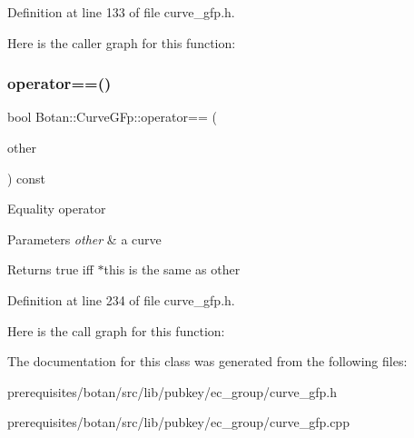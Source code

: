 Definition at line 133 of file curve\+\_\+gfp.\+h.

Here is the caller graph for this function\+:
\mbox{\label{class_botan_1_1_curve_g_fp_adf896804903ce76835069b5d51aeb161}} 
\subsubsection{\texorpdfstring{operator==()}{operator==()}}
{\footnotesize\ttfamily bool Botan\+::\+Curve\+G\+Fp\+::operator== (\begin{DoxyParamCaption}\item[{const \mbox{\hyperlink{class_botan_1_1_curve_g_fp}{Curve\+G\+Fp}} \&}]{other }\end{DoxyParamCaption}) const\hspace{0.3cm}{\ttfamily [inline]}}

Equality operator 
\begin{DoxyParams}{Parameters}
{\em other} & a curve \\
\hline
\end{DoxyParams}
\begin{DoxyReturn}{Returns}
true iff $\ast$this is the same as other 
\end{DoxyReturn}


Definition at line 234 of file curve\+\_\+gfp.\+h.

Here is the call graph for this function\+:


The documentation for this class was generated from the following files\+:\begin{DoxyCompactItemize}
\item 
prerequisites/botan/src/lib/pubkey/ec\+\_\+group/curve\+\_\+gfp.\+h\item 
prerequisites/botan/src/lib/pubkey/ec\+\_\+group/curve\+\_\+gfp.\+cpp\end{DoxyCompactItemize}

